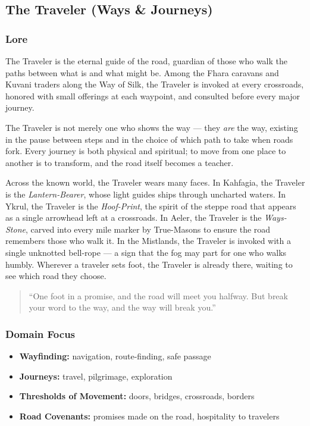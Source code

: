 
\subsection{The Traveler (Ways \& Journeys)}

\subsubsection*{Lore}
The Traveler is the eternal guide of the road, guardian of those who walk the paths between what is and what might be. Among the Fhara caravans and Kuvani traders along the Way of Silk, the Traveler is invoked at every crossroads, honored with small offerings at each waypoint, and consulted before every major journey.

The Traveler is not merely one who shows the way --- they \emph{are} the way, existing in the pause between steps and in the choice of which path to take when roads fork. Every journey is both physical and spiritual; to move from one place to another is to transform, and the road itself becomes a teacher.

Across the known world, the Traveler wears many faces. In Kahfagia, the Traveler is the \textit{Lantern-Bearer}, whose light guides ships through uncharted waters. In Ykrul, the Traveler is the \textit{Hoof-Print}, the spirit of the steppe road that appears as a single arrowhead left at a crossroads. In Aeler, the Traveler is the \textit{Ways-Stone}, carved into every mile marker by True-Masons to ensure the road remembers those who walk it. In the Mistlands, the Traveler is invoked with a single unknotted bell-rope --- a sign that the fog may part for one who walks humbly. Wherever a traveler sets foot, the Traveler is already there, waiting to see which road they choose.

\begin{quote}
``One foot in a promise, and the road will meet you halfway. But break your word to the way, and the way will break you.''
\end{quote}

\subsubsection*{Domain Focus}
\begin{itemize}
  \item \textbf{Wayfinding:} navigation, route-finding, safe passage
  \item \textbf{Journeys:} travel, pilgrimage, exploration
  \item \textbf{Thresholds of Movement:} doors, bridges, crossroads, borders
  \item \textbf{Road Covenants:} promises made on the road, hospitality to travelers
\end{itemize}

